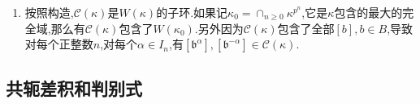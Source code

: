 \begin{enumerate}
\begin{proof}
    	只需证明第一句断言.首先$\mathcal{C}_{n+1}(\kappa)$是$W_{n+1}(\kappa)$的子环,并且它在$\mathrm{pr}$下的像是由$W_n(\kappa^{p^n})$和$[b],b\in B$生成的子环.但是$\mathcal{C}_n(\kappa)$是被$W_n(\kappa^{p^{n-1}})$和$[b],b\in B$生成的子环,所以这个限制映射$\pi$是定义良好的.下面要说明它是满射.
    	
    	\qquad
    	
    	对每个$n\ge1$,考虑$W_n(\kappa)$上的滤过$W_n(\kappa)\supseteq V(W_n(\kappa))\supseteq\cdots\supseteq V^n(W_n(\kappa))=0$,它诱导了$\mathcal{C}_n(\kappa)$上的滤过$\mathcal{C}_n(\kappa)\supseteq p\mathcal{C}_n(\kappa)\supseteq\cdots\supseteq p^n\mathcal{C}_n(\kappa)=0$(因为我们证明了$\mathcal{C}_n(\kappa)\cap V^r(W_n(\kappa))=p^r\mathcal{C}_n(\kappa)$).为了证明$\pi$是满射,只需证明它诱导的分次环之间的同态$\mathrm{gr}\pi$是满射.但是对$r<n$考虑如下交换图表,其中$j$就是$\kappa^{p^n}\subseteq\kappa$的包含映射,所以这里$\mathrm{gr}\pi$是满射:
    	$$\xymatrix{p^r\mathcal{C}_{n+1}(\kappa)/p^{r+1}\mathcal{C}_{n+1}(\kappa)\cong\kappa^{p^r}\ar[rr]^{\mathrm{gr}\pi}\ar[d]_j&&p^r\mathcal{C}_n(\kappa)/p^{r+1}\mathcal{C}_n(\kappa)\cong\kappa^{p^r}\ar[d]_j\\V^rW_{n+1}(\kappa)/V^{r+1}W_{n+1}(\kappa)\cong\kappa\ar[rr]^{\mathrm{gr.pr}=\mathrm{id}}&&V^rW_n(\kappa)/V^{r+1}W_n(\kappa)\cong\kappa}$$
    	
    	而对于$r=n$有终端$p^n\mathcal{C}_n(\kappa)=0$,于是$\mathrm{gr}\pi$是满射.
    \end{proof}
    \item 按照构造,$\mathcal{C}(\kappa)$是$W(\kappa)$的子环.如果记$\kappa_0=\cap_{n\ge0}\kappa^{p^n}$,它是$\kappa$包含的最大的完全域,那么有$\mathcal{C}(\kappa)$包含了$W(\kappa_0)$.另外因为$\mathcal{C}(\kappa)$包含了全部$[b],b\in B$,导致对每个正整数$n$,对每个$\alpha\in I_n$,有$[\mathfrak{b}^{\alpha}],[\mathfrak{b}^{-\alpha}]\in\mathcal{C}(\kappa)$.
\end{enumerate}
\newpage
\subsection{共轭差积和判别式}

